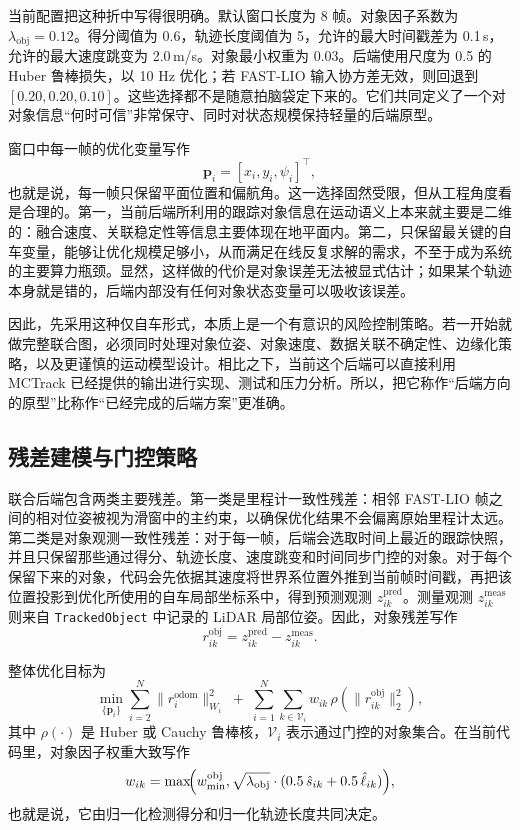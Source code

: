 \documentclass[utf8, a4paper, 12pt]{ctexart}
\begin{document}
当前配置把这种折中写得很明确。默认窗口长度为 8 帧。对象因子系数为 \(\lambda_{\mathrm{obj}}=0.12\)。得分阈值为 0.6，轨迹长度阈值为 5，允许的最大时间戳差为 0.1\,s，允许的最大速度跳变为 2.0\,m/s。对象最小权重为 0.03。后端使用尺度为 0.5 的 Huber 鲁棒损失，以 10 Hz 优化；若 FAST-LIO 输入协方差无效，则回退到 \([0.20, 0.20, 0.10]\)。这些选择都不是随意拍脑袋定下来的。它们共同定义了一个对对象信息“何时可信”非常保守、同时对状态规模保持轻量的后端原型。

窗口中每一帧的优化变量写作
\begin{equation}
\mathbf{p}_i=[x_i, y_i, \psi_i]^\top,
\end{equation}
也就是说，每一帧只保留平面位置和偏航角。这一选择固然受限，但从工程角度看是合理的。第一，当前后端所利用的跟踪对象信息在运动语义上本来就主要是二维的：融合速度、关联稳定性等信息主要体现在地平面内。第二，只保留最关键的自车变量，能够让优化规模足够小，从而满足在线反复求解的需求，不至于成为系统的主要算力瓶颈。显然，这样做的代价是对象误差无法被显式估计；如果某个轨迹本身就是错的，后端内部没有任何对象状态变量可以吸收该误差。

因此，先采用这种仅自车形式，本质上是一个有意识的风险控制策略。若一开始就做完整联合图，必须同时处理对象位姿、对象速度、数据关联不确定性、边缘化策略，以及更谨慎的运动模型设计。相比之下，当前这个后端可以直接利用 MCTrack 已经提供的输出进行实现、测试和压力分析。所以，把它称作“后端方向的原型”比称作“已经完成的后端方案”更准确。

\subsection{残差建模与门控策略}
联合后端包含两类主要残差。第一类是里程计一致性残差：相邻 FAST-LIO 帧之间的相对位姿被视为滑窗中的主约束，以确保优化结果不会偏离原始里程计太远。第二类是对象观测一致性残差：对于每一帧，后端会选取时间上最近的跟踪快照，并且只保留那些通过得分、轨迹长度、速度跳变和时间同步门控的对象。对于每个保留下来的对象，代码会先依据其速度将世界系位置外推到当前帧时间戳，再把该位置投影到优化所使用的自车局部坐标系中，得到预测观测 \(z^{\mathrm{pred}}_{ik}\)。测量观测 \(z^{\mathrm{meas}}_{ik}\) 则来自 \texttt{TrackedObject} 中记录的 LiDAR 局部位姿。因此，对象残差写作
\begin{equation}
r^{\mathrm{obj}}_{ik}=z^{\mathrm{pred}}_{ik}-z^{\mathrm{meas}}_{ik}.
\end{equation}

整体优化目标为
\begin{equation}
\min_{\{\mathbf{p}_i\}}
\sum_{i=2}^{N}\|r^{\mathrm{odom}}_i\|_{W_i}^2
\;+\;
\sum_{i=1}^{N}\sum_{k\in\mathcal{V}_i}
w_{ik}\,\rho\!\left(\|r^{\mathrm{obj}}_{ik}\|_2^2\right),
\end{equation}
其中 \(\rho(\cdot)\) 是 Huber 或 Cauchy 鲁棒核，\(\mathcal{V}_i\) 表示通过门控的对象集合。在当前代码里，对象因子权重大致写作
\begin{equation}
w_{ik}=
\max\!\Bigl(
w_{\min}^{\mathrm{obj}},
\sqrt{\lambda_{\mathrm{obj}}}\cdot
(0.5\,\hat{s}_{ik}+0.5\,\hat{\ell}_{ik})
\Bigr),
\end{equation}
也就是说，它由归一化检测得分和归一化轨迹长度共同决定。
\end{document}
